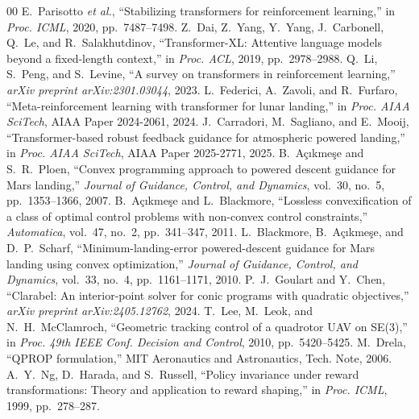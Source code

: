 \documentclass[conference]{IEEEtran}
\begin{document}
\begin{thebibliography}{00}
 E.~Parisotto \textit{et al.}, ``Stabilizing transformers for reinforcement learning,'' in \textit{Proc. ICML}, 2020, pp.~7487--7498.
 Z.~Dai, Z.~Yang, Y.~Yang, J.~Carbonell, Q.~Le, and R.~Salakhutdinov, ``Transformer-XL: Attentive language models beyond a fixed-length context,'' in \textit{Proc. ACL}, 2019, pp.~2978--2988.
 Q.~Li, S.~Peng, and S.~Levine, ``A survey on transformers in reinforcement learning,'' \textit{arXiv preprint arXiv:2301.03044}, 2023.
 L.~Federici, A.~Zavoli, and R.~Furfaro, ``Meta-reinforcement learning with transformer for lunar landing,'' in \textit{Proc. AIAA SciTech}, AIAA Paper 2024-2061, 2024.
 J.~Carradori, M.~Sagliano, and E.~Mooij, ``Transformer-based robust feedback guidance for atmospheric powered landing,'' in \textit{Proc. AIAA SciTech}, AIAA Paper 2025-2771, 2025.
 B.~A\c{c}{\i}kme\c{s}e and S.~R.~Ploen, ``Convex programming approach to powered descent guidance for Mars landing,'' \textit{Journal of Guidance, Control, and Dynamics}, vol.~30, no.~5, pp.~1353--1366, 2007.
 B.~A\c{c}{\i}kme\c{s}e and L.~Blackmore, ``Lossless convexification of a class of optimal control problems with non-convex control constraints,'' \textit{Automatica}, vol.~47, no.~2, pp.~341--347, 2011.
 L.~Blackmore, B.~A\c{c}{\i}kme\c{s}e, and D.~P.~Scharf, ``Minimum-landing-error powered-descent guidance for Mars landing using convex optimization,'' \textit{Journal of Guidance, Control, and Dynamics}, vol.~33, no.~4, pp.~1161--1171, 2010.
 P.~J.~Goulart and Y.~Chen, ``Clarabel: An interior-point solver for conic programs with quadratic objectives,'' \textit{arXiv preprint arXiv:2405.12762}, 2024.
 T.~Lee, M.~Leok, and N.~H.~McClamroch, ``Geometric tracking control of a quadrotor UAV on SE(3),'' in \textit{Proc. 49th IEEE Conf. Decision and Control}, 2010, pp.~5420--5425.
 M.~Drela, ``QPROP formulation,'' MIT Aeronautics and Astronautics, Tech. Note, 2006.
 A.~Y.~Ng, D.~Harada, and S.~Russell, ``Policy invariance under reward transformations: Theory and application to reward shaping,'' in \textit{Proc. ICML}, 1999, pp.~278--287.
\end{thebibliography}
\end{document}
